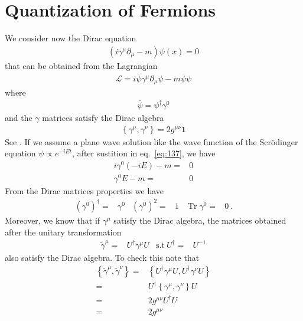 \section{Quantization of Fermions}
\label{sec:quant-ferm}
\begin{frame}
We consider now the Dirac equation
\begin{align}
\label{eq:137}
  (i\gamma^\mu\partial_\mu-m)\psi(x)=0
\end{align}
that can be obtained from the Lagrangian
\begin{align}
  \mathcal{L}=i\overline{\psi}\gamma^\mu\partial_\mu\psi-m\overline{\psi}\psi
\end{align}
where
\begin{align}
  \overline{\psi}=\psi^\dagger\gamma^0
\end{align}
and the $\gamma$ matrices satisfy the Dirac algebra
\begin{align}
\label{eq:140}
\left\{\gamma^\mu,\gamma^\nu\right\} = 2g^{\mu\nu}\mathbf{1}
\end{align}
See \cite{lsm}.
If we assume a plane wave solution like the wave function of the Scr\"odinger equation $\psi\propto e^{-i E t}$, after sustition in eq.~\eqref{eq:137}, we have
\begin{align}
  \label{eq:139}
  i \gamma^0 (-i E)-m=&0\nonumber\\
   \gamma^0 E-m=&0
\end{align}
From the Dirac matrices properties we have
\begin{align}
  \label{eq:138}
\left(\gamma^0\right)^\dagger=&\gamma^0 & \left(\gamma^0\right)^2=&1 & \operatorname{Tr}\gamma^0=&0\,.
\end{align}
Moreover, we know that if $\gamma^\mu$ satisfy the Dirac algebra, the matrices obtained after the unitary transformation
\begin{align}
  \widetilde{\gamma}^\mu=&U^\dagger \gamma^\mu U & \text{s.t}\ U^\dagger=&U^{-1}
\end{align}
also satisfy the Dirac algebra. To check this note that
\begin{align}
  \left\{\widetilde{\gamma}^\mu,\widetilde{\gamma}^\nu\right\}=&
   \left\{U^\dagger{\gamma}^\mu U,U^\dagger{\gamma}^\nu U\right\}\nonumber\\
=&U^\dagger\left\{{\gamma}^\mu,{\gamma}^\nu\right\}U\nonumber\\
=&2g^{\mu\nu}U^\dagger U\nonumber\\
=&2g^{\mu\nu}
\end{align}

\end{frame}
